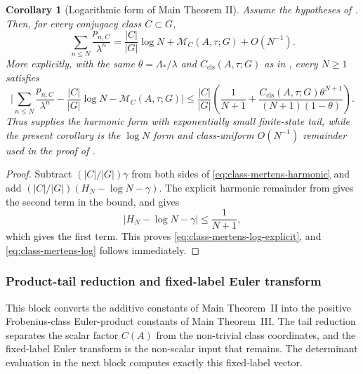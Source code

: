 \documentclass[11pt,a4paper]{amsart}
\theoremstyle{plain}
\newtheorem{corollary}[theorem]{Corollary}
\theoremstyle{definition}
\theoremstyle{remark}
\newcommand{\abs}[1]{\lvert #1 \rvert}
\begin{document}
\begin{corollary}[Logarithmic form of Main Theorem II]
  \label{cor:class-mertens-log-form}
  Assume the hypotheses of .  Then, for
  every conjugacy class \(C\subset G\),
  \begin{equation}\label{eq:class-mertens-log}
    \sum_{n\le N}\frac{p_{n,C}}{\lambda^n}
    =
    \frac{|C|}{|G|}\log N+\mathcal M_C(A,\tau;G)+O(N^{-1}).
  \end{equation}
  More explicitly, with the same \(\theta=\Lambda_*/\lambda\) and
  \(C_{\mathrm{cls}}(A,\tau;G)\) as in
  , every \(N\ge1\) satisfies
  \begin{equation}\label{eq:class-mertens-log-explicit}
    \abs{
      \sum_{n\le N}\frac{p_{n,C}}{\lambda^n}
      -\frac{|C|}{|G|}\log N
      -\mathcal M_C(A,\tau;G)
    }
    \le
    \frac{|C|}{|G|}
    \left(
      \frac{1}{N+1}
      +
      \frac{
        C_{\mathrm{cls}}(A,\tau;G)\theta^{N+1}
      }{
        (N+1)(1-\theta)
      }
    \right).
  \end{equation}
  Thus  supplies the harmonic form with
  exponentially small finite-state tail, while the present corollary is the
  \(\log N\) form and class-uniform \(O(N^{-1})\) remainder used in the
  proof of .
\end{corollary}

\begin{proof}
  Subtract \((|C|/|G|)\gamma\) from both sides of
  \eqref{eq:class-mertens-harmonic} and add
  \((|C|/|G|)(H_N-\log N-\gamma)\).  The explicit harmonic remainder from
   gives the second term in the bound, and
   gives
  \[
    \abs{H_N-\log N-\gamma}
    \le
    \frac{1}{N+1},
  \]
  which gives the first term.  This proves
  \eqref{eq:class-mertens-log-explicit}, and
  \eqref{eq:class-mertens-log} follows immediately.
\end{proof}

\subsubsection{Product-tail reduction and fixed-label Euler transform}
\label{subsubsec:class-product-tail-reduction}

This block converts the additive constants of Main Theorem~II into the
positive Frobenius-class Euler-product constants of Main Theorem~III.  The
tail reduction separates the scalar factor \(C(A)\) from the non-trivial class
coordinates, and the fixed-label Euler transform is the non-scalar input that
remains.  The determinant evaluation in the next block computes exactly this
fixed-label vector.
\end{document}
